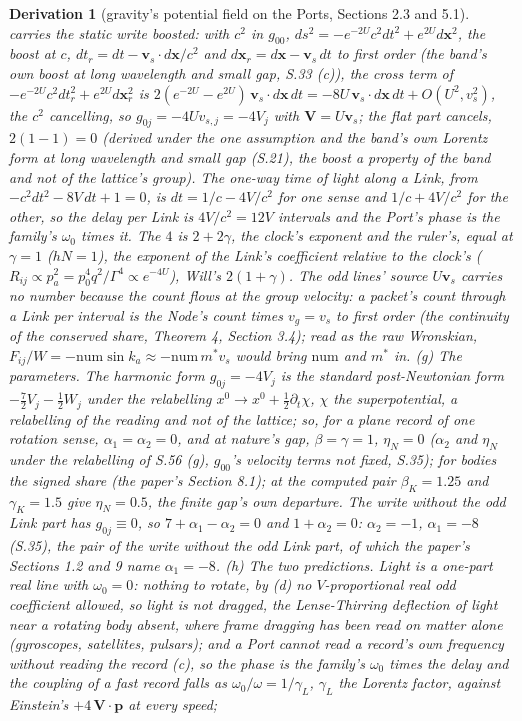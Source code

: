 \documentclass[pdflatex,sn-mathphys-num]{sn-jnl}
\newcommand{\num}{\mathrm{num}}
\theoremstyle{thmstyleone}
\newtheorem{derivation}{Derivation}
\begin{document}
\begin{derivation}[gravity's potential field on the Ports, Sections 2.3 and 5.1]
carries the static write boosted: with $c^2$ in $g_{00}$, $ds^2 = -e^{-2U}c^2dt^2 + e^{2U}d\mathbf x^2$, the boost at $c$, $dt_r = dt - \mathbf v_s\cdot d\mathbf x / c^2$ and $d\mathbf x_r = d\mathbf x - \mathbf v_s\,dt$ to first order (the band's own boost at long wavelength and small gap, S.33 (c)), the cross term of $-e^{-2U}c^2dt_r^2 + e^{2U}d\mathbf x_r^2$ is $2(e^{-2U} - e^{2U})\,\mathbf v_s\cdot d\mathbf x\,dt = -8U\,\mathbf v_s\cdot d\mathbf x\,dt + O(U^2, v_s^2)$, the $c^2$ cancelling, so $g_{0j} = -4Uv_{s,j} = -4V_j$ with $\mathbf V = U\mathbf v_s$; the flat part cancels, $2(1 - 1) = 0$ (derived under the one assumption and the band's own Lorentz form at long wavelength and small gap (S.21), the boost a property of the band and not of the lattice's group). The one-way time of light along a Link, from $-c^2dt^2 - 8V\,dt + 1 = 0$, is $dt = 1 / c - 4V / c^2$ for one sense and $1 / c + 4V / c^2$ for the other, so the delay per Link is $4V / c^2 = 12V$ intervals and the Port's phase is the family's $\omega_0$ times it. The $4$ is $2 + 2\gamma$, the clock's exponent and the ruler's, equal at $\gamma = 1$ ($hN = 1$), the exponent of the Link's coefficient relative to the clock's ($R_{ij} \propto p_a^2 = p_0^4q^2 / \Gamma^4 \propto e^{-4U}$), Will's $2(1 + \gamma)$. The odd lines' source $U\mathbf v_s$ carries no number because the count flows at the group velocity: a packet's count through a Link per interval is the Node's count times $v_g = v_s$ to first order (the continuity of the conserved share, Theorem 4, Section 3.4); read as the raw Wronskian, $F_{ij} / W = -\num\sin k_a \approx -\num\,m^*v_s$ would bring $\num$ and $m^*$ in. (g) \emph{The parameters.} The harmonic form $g_{0j} = -4V_j$ is the standard post-Newtonian form $-\tfrac72 V_j - \tfrac12 W_j$ under the relabelling $x^0 \to x^0 + \tfrac12\partial_t\chi$, $\chi$ the superpotential, a relabelling of the reading and not of the lattice; so, for a plane record of one rotation sense, $\alpha_1 = \alpha_2 = 0$, and at nature's gap, $\beta = \gamma = 1$, $\eta_N = 0$ ($\alpha_2$ and $\eta_N$ under the relabelling of S.56 (g), $g_{00}$'s velocity terms not fixed, S.35); for bodies the signed share (the paper's Section 8.1); at the computed pair $\beta_K = 1.25$ and $\gamma_K = 1.5$ give $\eta_N = 0.5$, the finite gap's own departure. The write without the odd Link part has $g_{0j} \equiv 0$, so $7 + \alpha_1 - \alpha_2 = 0$ and $1 + \alpha_2 = 0$: $\alpha_2 = -1$, $\alpha_1 = -8$ (S.35), the pair of the write without the odd Link part, of which the paper's Sections 1.2 and 9 name $\alpha_1 = -8$. (h) \emph{The two predictions.} Light is a one-part real line with $\omega_0 = 0$: nothing to rotate, by (d) no $V$-proportional real odd coefficient allowed, so light is not dragged, the Lense-Thirring deflection of light near a rotating body absent, where frame dragging has been read on matter alone (gyroscopes, satellites, pulsars); and a Port cannot read a record's own frequency without reading the record (c), so the phase is the family's $\omega_0$ times the delay and the coupling of a fast record falls as $\omega_0 / \omega = 1 / \gamma_L$, $\gamma_L$ the Lorentz factor, against Einstein's $+4\,\mathbf V\cdot\mathbf p$ at every speed; 
\end{derivation}
\end{document}

